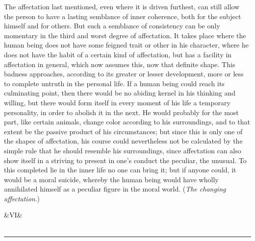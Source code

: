 \documentclass[12pt,a4paper,openany]{book}
\newcommand{\opage}[1]{\marginnote{\footnotesize\textit{[#1]}}}
\newcommand{\anthsection}[2]{\clearpage\begin{center}\ifx&#1&\else{\large #1}\\[0.6em]\fi{\Large #2}\\[0.5em]\rule{3em}{0.4pt}\end{center}\medskip}
\begin{document}
The affectation last mentioned, even where it is driven furthest, can still allow the
person to have a lasting semblance of inner coherence, both for the subject himself
and for others. But such a semblance of consistency can be only momentary in the third
and worst degree of affectation. It takes place where the human being does not have
some feigned trait or other in his character, where he does not have the habit of a
certain kind of affectation, but has a facility in affectation in general, which now
assumes this, now that definite shape. This badness approaches, according to its
greater or lesser development, more or less to complete untruth in the personal life.
If a human being could reach its culminating point, then there would be no abiding
kernel in
\setcounter{footnote}{0}%
\opage{161}his thinking and willing, but there would form itself in every moment of his life a
temporary personality, in order to abolish it in the next. He would probably for the
most part, like certain animals, change color according to his surroundings, and to
that extent be the passive product of his circumstances; but since this is only one of
the shapes of affectation, his course could nevertheless not be calculated by the
simple rule that he should resemble his surroundings, since affectation can also show
itself in a striving to present in one's conduct the peculiar, the unusual. To this
completed lie in the inner life no one can bring it; but if anyone could, it would be
a moral suicide, whereby the human being would have wholly annihilated himself as a
peculiar figure in the moral world. (\emph{The changing affectation}.)

\setcounter{footnote}{0}%
\anthsection{VI} {SØREN KIERKEGAARD}\opage{162}
\end{document}
